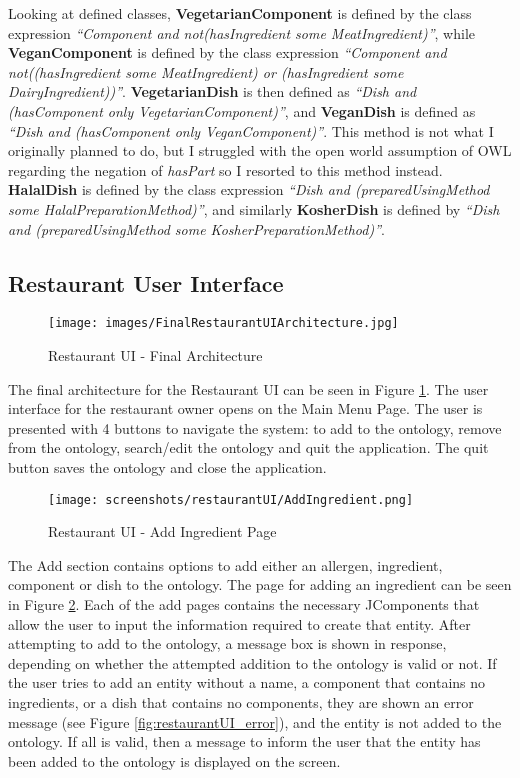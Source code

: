 Looking at defined classes, \textbf{VegetarianComponent} is defined by the class expression \textit{``Component and not(hasIngredient some MeatIngredient)''}, while \textbf{VeganComponent} is defined by the class expression \textit{``Component and not((hasIngredient some MeatIngredient) or (hasIngredient some DairyIngredient))''}. \textbf{VegetarianDish} is then defined as \textit{``Dish and (hasComponent only VegetarianComponent)''}, and \textbf{VeganDish} is defined as \textit{``Dish and (hasComponent only VeganComponent)''}. This method is not what I originally planned to do, but I struggled with the open world assumption of OWL regarding the negation of \textit{hasPart} so I resorted to this method instead. \textbf{HalalDish} is defined by the class expression \textit{``Dish and (preparedUsingMethod some HalalPreparationMethod)''}, and similarly \textbf{KosherDish} is defined by \textit{``Dish and (preparedUsingMethod some KosherPreparationMethod)''}.

\subsection{Restaurant User Interface}

\begin{figure}[h]
    \centering
    \captionsetup{justification=centering}
    \texttt{[image: images/FinalRestaurantUIArchitecture.jpg]}
    \caption{Restaurant UI - Final Architecture}
    \label{fig:restaurantUI_final_architecture}
\end{figure}

The final architecture for the Restaurant UI can be seen in Figure \ref{fig:restaurantUI_final_architecture}. The user interface for the restaurant owner opens on the Main Menu Page. The user is presented with 4 buttons to navigate the system: to add to the ontology, remove from the ontology, search/edit the ontology and quit the application. The quit button  saves the ontology and close the application.

\begin{figure}[h]
    \centering
    \captionsetup{justification=centering}
    \texttt{[image: screenshots/restaurantUI/AddIngredient.png]}
    \caption{Restaurant UI - Add Ingredient Page}
    \label{fig:restaurantUI_add_ing_page}
\end{figure}

The Add section contains options to add either an allergen, ingredient, component or dish to the ontology. The page for adding an ingredient can be seen in Figure \ref{fig:restaurantUI_add_ing_page}. Each of the add pages contains the necessary JComponents that allow the user to input the information required to create that entity. After attempting to add to the ontology, a message box is shown in response, depending on whether the attempted addition to the ontology is valid or not. If the user tries to add an entity without a name, a component that contains no ingredients, or a dish that contains no components, they are shown an error message (see Figure \ref{fig:restaurantUI_error}), and the entity is not added to the ontology. If all is valid, then a message to inform the user that the entity has been added to the ontology is displayed on the screen.

